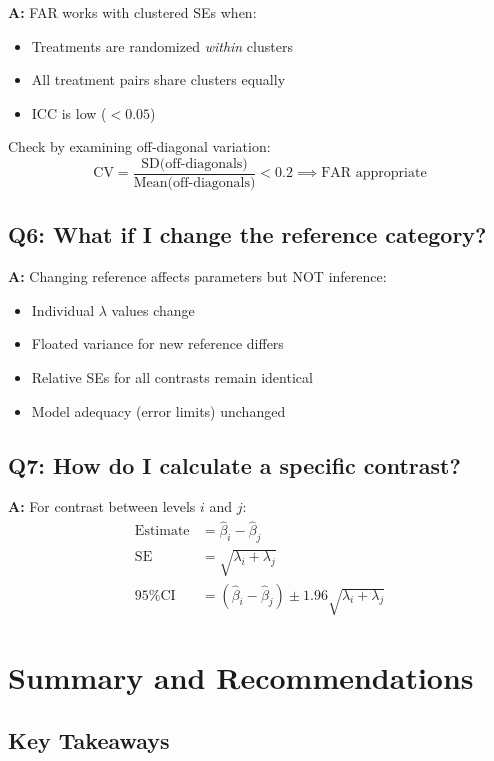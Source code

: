 \documentclass[11pt]{article}
\begin{document}
\textbf{A:} FAR works with clustered SEs when:
\begin{itemize}
    \item Treatments are randomized \textit{within} clusters
    \item All treatment pairs share clusters equally
    \item ICC is low ($< 0.05$)
\end{itemize}

Check by examining off-diagonal variation:
\begin{equation}
    \text{CV} = \frac{\text{SD(off-diagonals)}}{\text{Mean(off-diagonals)}} < 0.2 \implies \text{FAR appropriate}
\end{equation}

\subsection{Q6: What if I change the reference category?}

\textbf{A:} Changing reference affects parameters but NOT inference:
\begin{itemize}
    \item Individual $\lambda$ values change
    \item Floated variance for new reference differs
    \item Relative SEs for all contrasts remain identical
    \item Model adequacy (error limits) unchanged
\end{itemize}

\subsection{Q7: How do I calculate a specific contrast?}

\textbf{A:} For contrast between levels $i$ and $j$:
\begin{align}
    \text{Estimate} &= \hat{\beta}_i - \hat{\beta}_j \\
    \text{SE} &= \sqrt{\lambda_i + \lambda_j} \\
    \text{95\% CI} &= (\hat{\beta}_i - \hat{\beta}_j) \pm 1.96\sqrt{\lambda_i + \lambda_j}
\end{align}

\section{Summary and Recommendations}

\subsection{Key Takeaways}
\end{document}
